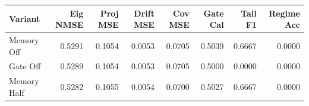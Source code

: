 \begin{tabular}{lrrrrrrr}
\toprule
Variant & Eig NMSE & Proj MSE & Drift MSE & Cov MSE & Gate Cal & Tail F1 & Regime Acc \\
\midrule
Memory Off & 0.5291 & 0.1054 & 0.0053 & 0.0705 & 0.5039 & 0.6667 & 0.0000 \\
Gate Off & 0.5289 & 0.1054 & 0.0053 & 0.0705 & 0.5000 & 0.0000 & 0.0000 \\
Memory Half & 0.5282 & 0.1055 & 0.0054 & 0.0700 & 0.5027 & 0.6667 & 0.0000 \\
\bottomrule
\end{tabular}
